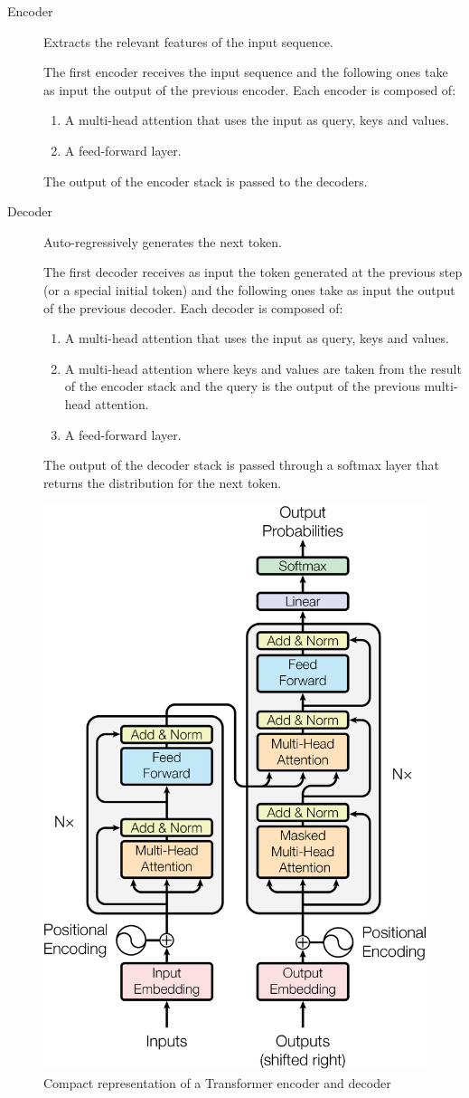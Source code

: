 \begin{description}
        \begin{description}
            \item[Encoder] 
                Extracts the relevant features of the input sequence.
                
                The first encoder receives the input sequence and the following ones take as input the output of the previous encoder.
                Each encoder is composed of:
                \begin{enumerate}
                    \item A multi-head attention that uses the input as query, keys and values.
                    \item A feed-forward layer.
                \end{enumerate} 

                The output of the encoder stack is passed to the decoders.

            \item[Decoder] 
                Auto-regressively generates the next token.

                The first decoder receives as input the token generated at the previous step (or a special initial token) 
                and the following ones take as input the output of the previous decoder.
                Each decoder is composed of:
                \begin{enumerate}
                    \item A multi-head attention that uses the input as query, keys and values.
                    \item A multi-head attention where 
                        keys and values are taken from the result of the encoder stack and the query is the output of the previous multi-head attention.
                    \item A feed-forward layer.
                \end{enumerate}

                The output of the decoder stack is passed through a softmax layer that returns the distribution for the next token.
        \end{description}

        \begin{figure}[H]
            \centering
            \includegraphics[width=0.35\linewidth]{./img/transformer.png}
            \caption{Compact representation of a Transformer encoder and decoder}
        \end{figure}


\end{description}
